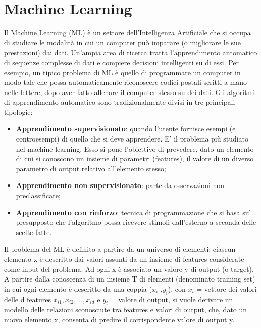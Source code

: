 \section{Machine Learning}
Il Machine Learning (ML) è un settore dell'Intelligenza Artificiale che si occupa di studiare le modalità in cui un computer può imparare (o migliorare le sue prestazioni) dai dati\cite{10}. Un'ampia area di ricerca tratta l'apprendimento automatico di sequenze complesse di dati e compiere decisioni intelligenti su di essi. Per esempio, un tipico problema di ML è quello di programmare un computer in modo tale che possa automaticamente riconoscere codici postali scritti a mano nelle lettere, dopo aver fatto allenare il computer stesso su dei dati.
Gli algoritmi di apprendimento automatico sono tradizionalmente divisi in tre principali tipologie:
\begin{itemize}
	\item \textbf{Apprendimento supervisionato}: quando l'utente fornisce esempi (e controesempi) di quello che si deve apprendere. E' il problema più studiato	nel machine learning. Esso si pone l’obiettivo di prevedere, dato un
	elemento di cui si conoscono un insieme di parametri (features), il valore di un diverso parametro di output relativo all’elemento stesso;
	\item \textbf{Apprendimento non supervisionato}: parte da osservazioni non preclassificate;
	\item \textbf{Apprendimento con rinforzo}: tecnica di programmazione che si basa sul 	presupposto che l'algoritmo possa ricevere stimoli dall'esterno a seconda
	delle scelte fatte.
\end{itemize}
Il problema del ML è definito a partire da un universo di elementi: ciascun elemento x è descritto dai valori assunti da un insieme di features considerate come input del problema. Ad ogni x è associato un valore y di output (o target). A partire dalla conoscenza di un insieme T di elementi (denominato training set) in cui ogni elemento è descritto da una coppia ($x_i$ ,$y_i$), con $x_i$ = vettore dei valori delle d features $x_{i1}, x_{i2}, ... , x_{id}$ e $y_i$ = valore di output, si vuole derivare un modello delle relazioni sconosciute tra features e valori di output, che, dato un nuovo elemento x, consenta di predire il corrispondente valore di output y. 
